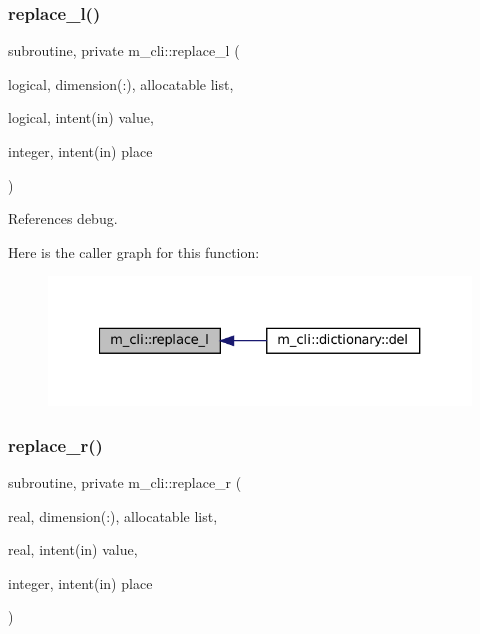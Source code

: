 \subsubsection{\texorpdfstring{replace\+\_\+l()}{replace\_l()}}
{\footnotesize\ttfamily subroutine, private m\+\_\+cli\+::replace\+\_\+l (\begin{DoxyParamCaption}\item[{logical, dimension(\+:), allocatable}]{list,  }\item[{logical, intent(in)}]{value,  }\item[{integer, intent(in)}]{place }\end{DoxyParamCaption})\hspace{0.3cm}{\ttfamily [private]}}



References debug.

Here is the caller graph for this function\+:\nopagebreak
\begin{figure}[H]
\begin{center}
\leavevmode
\includegraphics[width=327pt]{namespacem__cli_a89ed5c3b944f91d8135173206fbc7e07_icgraph}
\end{center}
\end{figure}
\mbox{\label{namespacem__cli_ab3b33abc8a6da174d3f27c2f2203038c}} 
\subsubsection{\texorpdfstring{replace\+\_\+r()}{replace\_r()}}
{\footnotesize\ttfamily subroutine, private m\+\_\+cli\+::replace\+\_\+r (\begin{DoxyParamCaption}\item[{real, dimension(\+:), allocatable}]{list,  }\item[{real, intent(in)}]{value,  }\item[{integer, intent(in)}]{place }\end{DoxyParamCaption})\hspace{0.3cm}{\ttfamily [private]}}




